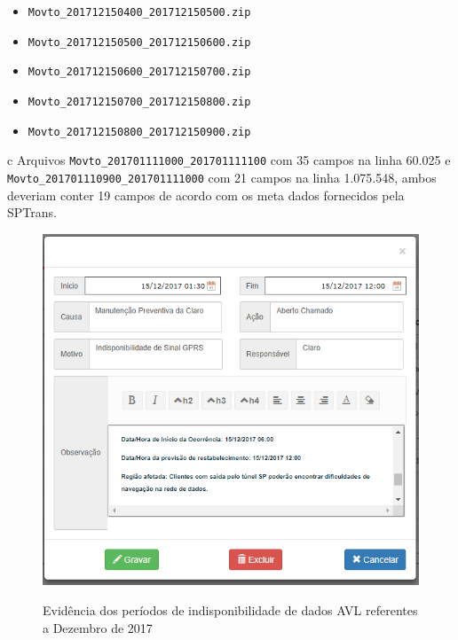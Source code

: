 \documentclass[
	12pt,				%
	oneside,			%
	a4paper,			%
	english,			%
	brazil				%
	]{abntex2ppgsi}
\begin{document}
{{\begin{table}[!htb]
\begin{threeparttable}
\begin{tablenotes}
\begin{itemize}
\item \texttt{Movto\_201712150400\_201712150500.zip}
\item \texttt{Movto\_201712150500\_201712150600.zip}
\item \texttt{Movto\_201712150600\_201712150700.zip}
\item \texttt{Movto\_201712150700\_201712150800.zip}
\item \texttt{Movto\_201712150800\_201712150900.zip}
\end{itemize}
\item[c] Arquivos  \texttt{Movto\_201701111000\_201701111100} com 35 campos na linha 60.025 e \texttt{Movto\_201701110900\_201701111000} com 21 campos na linha 1.075.548, ambos deveriam conter 19 campos de acordo com os meta dados fornecidos pela SPTrans.
\end{tablenotes}
\end{threeparttable}
\end{table}

\begin{figure}[!htb]%
	\centering
 	  \caption{Evidência dos períodos de indisponibilidade de dados AVL referentes a Dezembro de 2017}
		\includegraphics[width=0.5\linewidth]{images/33310_ANEXO_E_SIC_33310.png}
	\label{fig:e_sic_33310}
\end{figure}

}}
\end{document}
